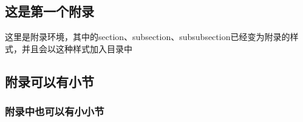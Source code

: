 \documentclass[a4paper,cs4size,UTF8,winfonts,boldfont,slantfont]{ctexart}
\begin{document}
	\clearpage
	
	
	\begin{appendices}
		\section{这是第一个附录}
		这里是附录环境，其中的section、subsection、subsubsection已经变为附录的样式，并且会以这种样式加入目录中
		\subsection{附录可以有小节}
		\subsubsection{附录中也可以有小小节}
	\end{appendices}
	
\end{document}
